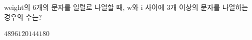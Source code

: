 weight의 $6$개의 문자를 일렬로 나열할 때, w와 i 사이에 $3$개 이상의 문자를 나열하는 경우의 수는?
\begin{choices32}{$48$}{$96$}{$120$}{$144$}{$180$}\end{choices32}
